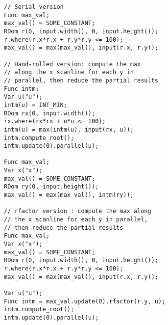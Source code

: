 \begin{lstlisting}[caption={Computing max over a circular reduction domain with radius of 10: serial vs. parallel hand-rolled vs. parallel rfactor.}, label={lst:circular_max}]
// Serial version
Func max_val;
max_val() = SOME_CONSTANT;
RDom r(0, input.width(), 0, input.height());
r.where(r.x*r.x + r.y*r.y <= 100);
max_val() = max(max_val(), input(r.x, r.y));

// Hand-rolled version: compute the max 
// along the x scanline for each y in 
// parallel, then reduce the partial results
Func intm;
Var u("u");
intm(u) = INT_MIN;
RDom rx(0, input.width());
rx.where(rx*rx + u*u <= 100);
intm(u) = max(intm(u), input(rx, u));
intm.compute_root();
intm.update(0).parallel(u);

Func max_val;
Var x("x");
max_val() = SOME_CONSTANT;
RDom ry(0, input.height());
max_val() = max(max_val(), intm(ry));

// rfactor version : compute the max along
// the x scanline for each y in parallel, 
// then reduce the partial results
Func max_val;
Var x("x");
max_val() = SOME_CONSTANT;
RDom r(0, input.width(), 0, input.height());
r.where(r.x*r.x + r.y*r.y <= 100);
max_val() = max(max_val(), input(r.x, r.y));

Var u("u");
Func intm = max_val.update(0).rfactor(r.y, u);
intm.compute_root();
intm.update(0).parallel(u);
\end{lstlisting}
